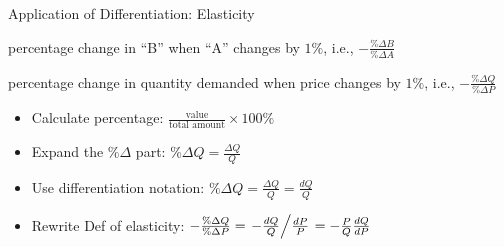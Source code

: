 \documentclass{beamer}
\begin{document}
\begin{frame}[t]{Application of Differentiation: Elasticity}
    \begin{definition}
	percentage change in ``B'' when ``A'' changes by $1\%$, i.e., $-\frac{\%  \Delta B}{\%  \Delta A} $
    \end{definition}
    \begin{definition}
	percentage change in quantity demanded when price changes by $1\%$, i.e., $-\frac{\%  \Delta Q}{\%  \Delta P} $
    \end{definition}
    \begin{itemize}
	\item Calculate percentage: $\frac{\text{value}}{\text{total amount}}  \times 100 \% $
        \item Expand the $\%  \Delta $ part: $\% \Delta Q = \frac{ \Delta Q}{Q} $
	\item Use differentiation notation: $\% \Delta Q = \frac{ \Delta Q}{Q} = \frac{d Q}{Q}  $
	\item Rewrite Def of elasticity: $-\frac{\%  \Delta Q}{\%  \Delta P} = \left. - \frac{dQ}{Q} \middle/ \frac{dP}{P} \right.  = -\frac{P}{Q} \frac{dQ}{dP} $
    \end{itemize}
\end{frame}
\end{document}
